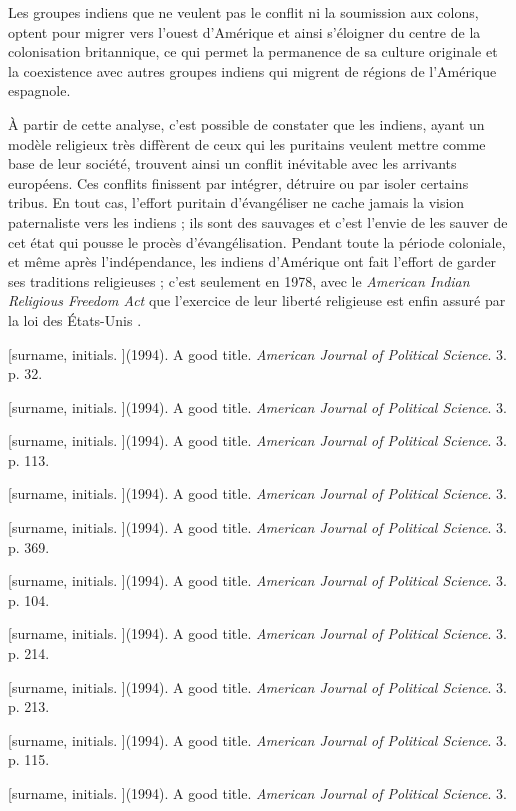 \documentclass{article}
\begin{document}
Les groupes indiens que ne veulent pas le conflit ni la soumission aux colons, optent pour migrer vers l'ouest d'Amérique et ainsi s'éloigner du centre de la colonisation britannique, ce qui permet la permanence de sa culture originale et la coexistence avec autres groupes indiens qui migrent de régions de l'Amérique espagnole.

À partir de cette analyse, c'est possible de constater que les indiens, ayant un modèle religieux très diffèrent de ceux qui les puritains veulent mettre comme base de leur société, trouvent ainsi un conflit inévitable avec les arrivants européens. Ces conflits finissent par intégrer, détruire ou par isoler certains tribus. En tout cas, l'effort puritain d'évangéliser ne cache jamais la vision paternaliste vers les indiens ; ils sont des sauvages et c'est l'envie de les sauver de cet état qui pousse le procès d'évangélisation. Pendant toute la période coloniale, et même après l'indépendance, les indiens d'Amérique ont fait l'effort de garder ses traditions religieuses ; c'est seulement en 1978, avec le \emph{American Indian Religious Freedom Act} que l'exercice de leur liberté religieuse est enfin assuré par la loi des États-Unis \cite{code-10}.

\newpage

\begin{thebibliography}{1}
\raggedright
{}
[surname, initials. ](1994). A good title. \emph{American Journal of Political Science}. 3. p. 32. 

[surname, initials. ](1994). A good title. \emph{American Journal of Political Science}. 3. 

[surname, initials. ](1994). A good title. \emph{American Journal of Political Science}. 3. p. 113. 

[surname, initials. ](1994). A good title. \emph{American Journal of Political Science}. 3. 

[surname, initials. ](1994). A good title. \emph{American Journal of Political Science}. 3. p. 369. 

[surname, initials. ](1994). A good title. \emph{American Journal of Political Science}. 3. p. 104. 

[surname, initials. ](1994). A good title. \emph{American Journal of Political Science}. 3. p. 214. 

[surname, initials. ](1994). A good title. \emph{American Journal of Political Science}. 3. p. 213. 

[surname, initials. ](1994). A good title. \emph{American Journal of Political Science}. 3. p. 115. 

[surname, initials. ](1994). A good title. \emph{American Journal of Political Science}. 3. 

\end{thebibliography}
\end{document}
